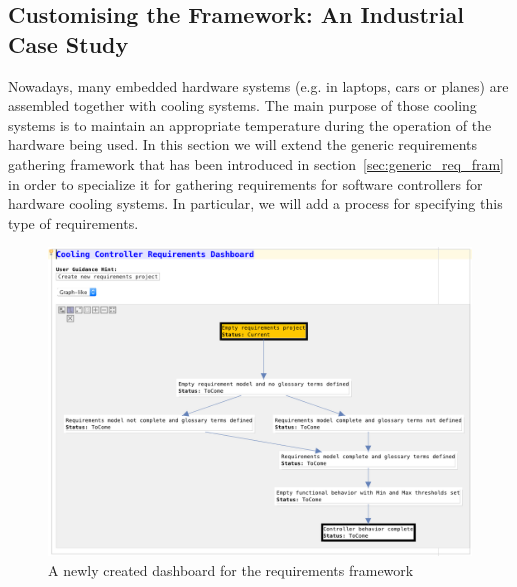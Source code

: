 
\subsection{Customising the Framework: An Industrial Case
Study}
\label{sec:custom_frame}
\vspace{-.2cm}
Nowadays, many embedded hardware systems (e.g. in laptops, cars or planes) are
assembled together with cooling systems. The main purpose of those cooling
systems is to maintain an appropriate temperature during the operation of the
hardware being used. In this section we will extend the generic requirements
gathering framework that has been introduced in
section~\ref{sec:generic_req_fram} in order to specialize it for gathering
requirements for software controllers for hardware cooling systems. In
particular, we will add a process for specifying this type of requirements.
\vspace{-.5cm}
\begin{figure}[!h]
\centering 
\includegraphics[width=.9\textwidth]{./figures/NewDashboard.png}
\vspace{-.3cm}
\caption{A newly created dashboard for the requirements framework}
\label{fig:empty_dashboard}
\vspace{-.6cm}
\end{figure}

